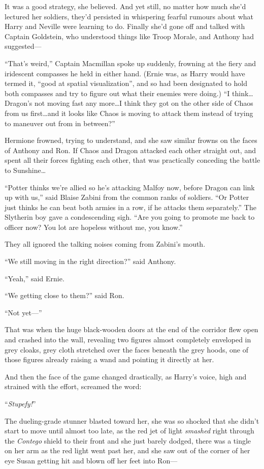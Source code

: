 It was a good strategy, she believed. And yet still, no matter how much she’d lectured her soldiers, they’d persisted in whispering fearful rumours about what Harry and Neville were learning to do. Finally she’d gone off and talked with Captain Goldstein, who understood things like Troop Morale, and Anthony had suggested—

“That’s weird,” Captain Macmillan spoke up suddenly, frowning at the fiery and iridescent compasses he held in either hand. (Ernie was, as Harry would have termed it, “good at spatial visualization”, and so had been designated to hold both compasses and try to figure out what their enemies were doing.) “I think…Dragon’s not moving fast any more…I think they got on the other side of Chaos from us first…and it looks like Chaos is moving to attack them instead of trying to maneuver out from in between?”

Hermione frowned, trying to understand, and she saw similar frowns on the faces of Anthony and Ron. If Chaos and Dragon attacked each other straight out, and spent all their forces fighting each other, that was practically conceding the battle to Sunshine…

“Potter thinks we’re allied so he’s attacking Malfoy now, before Dragon can link up with us,” said Blaise Zabini from the common ranks of soldiers. “Or Potter just thinks he can beat both armies in a row, if he attacks them separately.” The Slytherin boy gave a condescending sigh. “Are you going to promote me back to officer now? You lot are hopeless without me, you know.”

They all ignored the talking noises coming from Zabini’s mouth.

“We still moving in the right direction?” said Anthony.

“Yeah,” said Ernie.

“We getting close to them?” said Ron.

“Not yet—”

That was when the huge black-wooden doors at the end of the corridor flew open and crashed into the wall, revealing two figures almost completely enveloped in grey cloaks, grey cloth stretched over the faces beneath the grey hoods, one of those figures already raising a wand and pointing it directly at her.

And then the face of the game changed drastically, as Harry’s voice, high and strained with the effort, screamed the word:

“\emph{Stupefy!}”

The dueling-grade stunner blasted toward her, she was so shocked that she didn’t start to move until almost too late, as the red jet of light \emph{smashed} right through the \emph{Contego} shield to their front and she just barely dodged, there was a tingle on her arm as the red light went past her, and she saw out of the corner of her eye Susan getting hit and blown off her feet into Ron—

